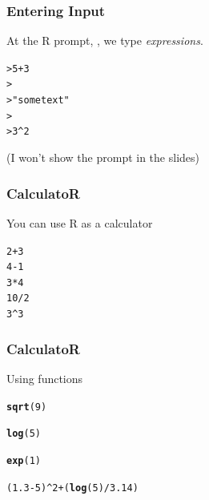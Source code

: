 \documentclass[12pt]{beamer}\usepackage[]{graphicx}\usepackage[]{color}
\makeatletter
\newcommand{\hlnum}[1]{\textcolor[rgb]{0.686,0.059,0.569}{#1}}%
\newcommand{\hlstr}[1]{\textcolor[rgb]{0.192,0.494,0.8}{#1}}%
\newcommand{\hlopt}[1]{\textcolor[rgb]{0,0,0}{#1}}%
\newcommand{\hlstd}[1]{\textcolor[rgb]{0.345,0.345,0.345}{#1}}%
\newcommand{\hlkwd}[1]{\textcolor[rgb]{0.737,0.353,0.396}{\textbf{#1}}}%
\newenvironment{kframe}{%
 \def\at@end@of@kframe{}%
 \ifinner\ifhmode%
  \def\at@end@of@kframe{\end{minipage}}%
  \begin{minipage}{\columnwidth}%
 \fi\fi%
 \def\FrameCommand##1{\hskip\@totalleftmargin \hskip-\fboxsep
 \colorbox{shadecolor}{##1}\hskip-\fboxsep
     \hskip-\linewidth \hskip-\@totalleftmargin \hskip\columnwidth}%
 \MakeFramed {\advance\hsize-\width
   \@totalleftmargin\z@ \linewidth\hsize
   \@setminipage}}%
 {\par\unskip\endMakeFramed%
 \at@end@of@kframe}
\newenvironment{knitrout}{}{} %
\makeatother
\begin{document}
\begin{frame}[fragile]
\frametitle{Entering Input}

At the R prompt, {\hilit \code{>}}, we type \textit{expressions}. 
\begin{knitrout}\footnotesize
{}\color{fgcolor}\begin{kframe}
\begin{alltt}
> 5 + 3
>
> \hlstr{"some text"}
>
> 3^2
\end{alltt}
\end{kframe}
\end{knitrout}
\eb
(I won't show the prompt in the slides)
\end{frame}


\begin{frame}[fragile]
\frametitle{CalculatoR}
You can use R as a calculator
\begin{knitrout}\footnotesize
{}\color{fgcolor}\begin{kframe}
\begin{alltt}
\hlnum{2} \hlopt{+} \hlnum{3}
\hlnum{4} \hlopt{-} \hlnum{1}
\hlnum{3} \hlopt{*} \hlnum{4}
\hlnum{10} \hlopt{/} \hlnum{2}
\hlnum{3}\hlopt{^}\hlnum{3}
\end{alltt}
\end{kframe}
\end{knitrout}

\end{frame}


\begin{frame}[fragile]
\frametitle{CalculatoR}
Using functions
\begin{knitrout}\footnotesize
{}\color{fgcolor}\begin{kframe}
\begin{alltt}
\hlkwd{sqrt}\hlstd{(}\hlnum{9}\hlstd{)}

\hlkwd{log}\hlstd{(}\hlnum{5}\hlstd{)}

\hlkwd{exp}\hlstd{(}\hlnum{1}\hlstd{)}

\hlstd{(}\hlnum{1.3} \hlopt{-} \hlnum{5}\hlstd{)}\hlopt{^}\hlnum{2} \hlopt{+} \hlstd{(}\hlkwd{log}\hlstd{(}\hlnum{5}\hlstd{)} \hlopt{/} \hlnum{3.14}\hlstd{)}
\end{alltt}
\end{kframe}
\end{knitrout}

\end{frame}
\end{document}
